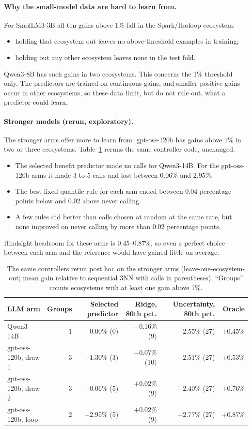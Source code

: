 \paragraph{Why the small-model data are hard to learn from.} For SmolLM3-3B all ten gains above 1\% fall in the Spark/Hadoop ecosystem:
\begin{itemize}
  \item holding that ecosystem out leaves no above-threshold examples in training;
  \item holding out any other ecosystem leaves none in the test fold.
\end{itemize}
Qwen3-8B has such gains in two ecosystems. This concerns the 1\% threshold only. The predictors are trained on continuous gains, and smaller positive gains occur in other ecosystems, so these data limit, but do not rule out, what a predictor could learn.

\paragraph{Stronger models (rerun, exploratory).} The stronger arms offer more to learn from: gpt-oss-120b has gains above 1\% in two or three ecosystems. Table~\ref{tab:routers-strong} reruns the same controller code, unchanged.
\begin{itemize}
  \item The selected benefit predictor made no calls for Qwen3-14B. For the gpt-oss-120b arms it made 3 to 5 calls and lost between 0.06\% and 2.95\%.
  \item The best fixed-quantile rule for each arm ended between 0.04 percentage points below and 0.02 above never calling.
  \item A few rules did better than calls chosen at random at the same rate, but none improved on never calling by more than 0.02 percentage points.
\end{itemize}
Hindsight headroom for these arms is 0.45--0.87\%, so even a perfect choice between each arm and the reference would have gained little on average.

\begin{table}[t]
\centering
\caption{The same controllers rerun post hoc on the stronger arms (leave-one-ecosystem-out; mean gain relative to sequential 3NN with calls in parentheses). ``Groups'' counts ecosystems with at least one gain above 1\%.}
\label{tab:routers-strong}
\small
\begin{tabular}{lrrrrr}
\toprule
LLM arm & Groups & Selected predictor & Ridge, 80th pct. & Uncertainty, 80th pct. & Oracle \\
\midrule
Qwen3-14B & 1 & $0.00\%$ (0) & $-0.16\%$ (9) & $-2.55\%$ (27) & $+0.45\%$ \\
gpt-oss-120b, draw 1 & 3 & $-1.30\%$ (3) & $-0.07\%$ (10) & $-2.51\%$ (27) & $+0.53\%$ \\
gpt-oss-120b, draw 2 & 3 & $-0.06\%$ (5) & $+0.02\%$ (9) & $-2.40\%$ (27) & $+0.76\%$ \\
gpt-oss-120b, loop & 2 & $-2.95\%$ (5) & $+0.02\%$ (9) & $-2.77\%$ (27) & $+0.87\%$ \\
\bottomrule
\end{tabular}
\end{table}

